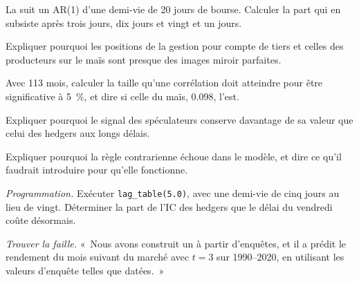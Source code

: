 \begin{exercise}[$\star$]\label{exo:s1:positioning-and-sentiment:2}
La  suit un AR(1) d'une demi-vie de 20 jours de bourse. Calculer la part qui en subsiste après trois jours, dix jours et vingt et un jours.
\end{exercise}

\begin{exercise}[$\star$]\label{exo:s1:positioning-and-sentiment:3}
Expliquer pourquoi les positions de la gestion pour compte de tiers et celles des producteurs sur le maïs sont presque des images miroir parfaites.
\end{exercise}

\begin{exercise}[$\star\star$]\label{exo:s1:positioning-and-sentiment:4}
Avec 113 mois, calculer la taille qu'une corrélation doit atteindre pour être significative à 5~\%, et dire si celle du maïs, 0.098, l'est.
\end{exercise}

\begin{exercise}[$\star\star$]\label{exo:s1:positioning-and-sentiment:5}
Expliquer pourquoi le signal des spéculateurs conserve davantage de sa valeur que celui des hedgers aux longs délais.
\end{exercise}

\begin{exercise}[$\star\star$]\label{exo:s1:positioning-and-sentiment:6}
Expliquer pourquoi la règle contrarienne échoue dans le modèle, et dire ce qu'il faudrait introduire pour qu'elle fonctionne.
\end{exercise}

\begin{exercise}[$\star\star\star$]\label{exo:s1:positioning-and-sentiment:7}
\emph{Programmation.} Exécuter \texttt{lag\_table(5.0)}, avec une demi-vie de cinq jours au lieu de vingt. Déterminer la part de l'IC des hedgers que le délai du vendredi
coûte désormais.
\end{exercise}

\begin{exercise}[$\star\star\star$]\label{exo:s1:positioning-and-sentiment:8}
\emph{Trouver la faille.} «~Nous avons construit un  à partir d'enquêtes, et il a prédit le rendement du mois suivant du marché avec $t = 3$ sur 1990--2020, en utilisant
les valeurs d'enquête telles que datées.~»
\end{exercise}

